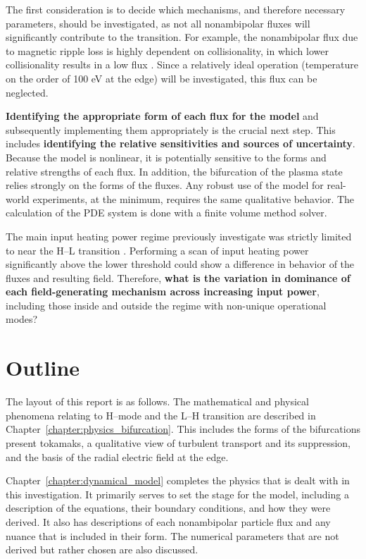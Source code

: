 The first consideration is to decide which mechanisms, and therefore necessary parameters, should be investigated, as not all nonambipolar fluxes will significantly contribute to the transition.
For example, the nonambipolar flux due to magnetic ripple loss is highly dependent on collisionality, in which lower collisionality results in a low flux \cite{stringer_effect_1972}.
Since a relatively ideal operation (temperature on the order of 100 eV at the edge) will be investigated, this flux can be neglected.

\textbf{Identifying the appropriate form of each flux for the model} and subsequently implementing them appropriately is the crucial next step.
This includes \textbf{identifying the relative sensitivities and sources of uncertainty}.
Because the model is nonlinear, it is potentially sensitive to the forms and relative strengths of each flux.
In addition, the bifurcation of the plasma state relies strongly on the forms of the fluxes.
Any robust use of the model for real-world experiments, at the minimum, requires the same qualitative behavior.
The calculation of the PDE system is done with a finite volume method solver.

The main input heating power regime previously investigate was strictly limited to near the H--L transition \cite{staps_backstepping_2017}.
Performing a scan of input heating power significantly above the lower threshold could show a difference in behavior of the fluxes and resulting field.
Therefore, \textbf{what is the variation in dominance of each field-generating mechanism across increasing input power}, including those inside and outside the regime with non-unique operational modes?

\section{Outline}\label{sec:outline}
The layout of this report is as follows.
The mathematical and physical phenomena relating to H--mode and the L--H transition are described in Chapter~\ref{chapter:physics_bifurcation}.
This includes the forms of the bifurcations present tokamaks, a qualitative view of turbulent transport and its suppression, and the basis of the radial electric field at the edge.

Chapter~\ref{chapter:dynamical_model} completes the physics that is dealt with in this investigation.
It primarily serves to set the stage for the model, including a description of the equations, their boundary conditions, and how they were derived.
It also has descriptions of each nonambipolar particle flux and any nuance that is included in their form.
The numerical parameters that are not derived but rather chosen are also discussed.

